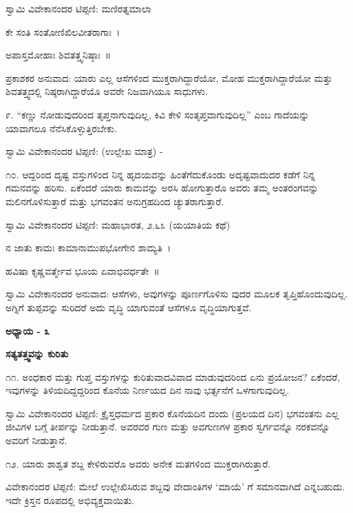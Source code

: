 ಸ್ವಾಮಿ ವಿವೇಕಾನಂದರ ಟಿಪ್ಪಣಿ: ಮಣಿರತ್ನಮಾಲಾ

ಕೇ ಸಂತಿ ಸಂತೋಣಿಖಿಲವೀತರಾಗಾಃ~।

ಅಪಾಸ್ತಮೋಹಾಃ ಶಿವತತ್ತ್ವನಿಷ್ಠಾಃ~॥

ಪ್ರಕಾಶಕರ ಅನುವಾದ: ಯಾರು ಎಲ್ಲ ಆಸೆಗಳಿಂದ ಮುಕ್ತರಾಗಿದ್ದಾರೆಯೋ, ಮೋಹ ಮುಕ್ತರಾಗಿದ್ದಾರೆಯೋ ಮತ್ತು ಶಿವತತ್ತ್ವದಲ್ಲಿ ನಿಷ್ಠರಾಗಿದ್ದಾರೆಯೊ ಅವರೇ ನಿಜವಾಗಿಯೂ ಸಾಧುಗಳು.

೯. “ಕಣ್ಣು ನೋಡುವುದರಿಂದ ತೃಪ್ತನಾಗುವುದಿಲ್ಲ, ಕಿವಿ ಕೇಳಿ ಸಂತೃಪ್ತವಾಗುವುದಿಲ್ಲ” ಎಂಬ ಗಾದೆಯನ್ನು ಯಾವಾಗಲೂ ನೆನೆಸಿಕೊಳ್ಳುತ್ತಿರಬೇಕು. 

ಸ್ವಾಮಿ ವಿವೇಕಾನಂದರ ಟಿಪ್ಪಣಿ: (ಉಲ್ಲೇಖ ಮಾತ್ರ) - 

೧೦. ಆದ್ದರಿಂದ ದೃಷ್ಟ ವಸ್ತುಗಳಿಂದ ನಿನ್ನ ಹೃದಯವನ್ನು ಹಿಂತೆಗೆದುಕೊಂಡು ಅದೃಷ್ಟವಾದುದರ ಕಡೆಗೆ ನಿನ್ನ ಗಮನವನ್ನು ಹರಿಸು. ಏಕೆಂದರೆ ಯಾರು ಕಾಮವನ್ನು ಅರಸಿ ಹೋಗುತ್ತಾರೊ ಅವರು ತಮ್ಮ ಅಂತರಂಗವನ್ನು ಮಲಿನಗೊಳಿಸುತ್ತಾರೆ ಮತ್ತು ಭಗವಂತನ ಅನುಗ್ರಹದಿಂದ ಚ್ಯುತರಾಗುತ್ತಾರೆ. 

ಸ್ವಾಮಿ ವಿವೇಕಾನಂದರ ಟಿಪ್ಪಣಿ: ಮಹಾಭಾರತ, ೨.೬೩ (ಯಯಾತಿಯ ಕಥೆ)

ನ ಜಾತು ಕಾಮಃ ಕಾಮಾನಾಮುಪಭೋಗೇನ ಶಾಮ್ಯತಿ~।

ಹವಿಷಾ ಕೃಷ್ಣವರ್ತ್ಮೇವ ಭೂಯ ಏವಾಭಿವರ್ಧತೇ~॥

ಸ್ವಾಮಿ ವಿವೇಕಾನಂದರ ಅನುವಾದ: ಆಸೆಗಳು, ಅವುಗಳನ್ನು ಪೂರ್ಣಗೊಳಿಸು ವುದರ ಮೂಲಕ ತೃಪ್ತಿಹೊಂದುವುದಿಲ್ಲ. ಅಗ್ನಿಗೆ ತುಪ್ಪವನ್ನು ಸುರಿದರೆ ಅದು ವೃದ್ಧಿ ಯಾಗುವಂತೆ ಆಸೆಗಳೂ ವೃದ್ಧಿಯಾಗುತ್ತವೆ.

\begin{center}
\textbf{ಅಧ್ಯಾಯ - ೩}
\end{center}

\begin{center}
\textbf{ಸತ್ಯತತ್ತ್ವವನ್ನು ಕುರಿತು}
\end{center}

೧೧. ಅಂಧಕಾರ ಮತ್ತು ಗುಪ್ತ ವಸ್ತುಗಳನ್ನು ಕುರಿತುವಾದವಿವಾದ ಮಾಡುವುದರಿಂದ ಏನು ಪ್ರಯೋಜನ? ಏಕೆಂದರೆ, ಇವುಗಳನ್ನು ತಿಳಿಯದಿದ್ದದ್ದರಿಂದ ಕೊನೆಯ ನಿರ್ಣಯದ ದಿನ ನಾವು ಭರ್ತ್ಸನೆಗೆ ಒಳಗಾಗುವುದಿಲ್ಲ. 

ಸ್ವಾಮಿ ವಿವೇಕಾನಂದರ ಟಿಪ್ಪಣಿ: ಕ್ರೈಸ್ತಧರ್ಮದ ಪ್ರಕಾರ ಕೊನೆಯದಿನ ದಂದು (ಪ್ರಲಯದ ದಿನ) ಭಗವಂತನು ಎಲ್ಲ ಜೀವಿಗಳ ಬಗ್ಗೆ ತೀರ್ಪನ್ನು ನೀಡುತ್ತಾನೆ. ಅವರವರ ಗುಣ ಮತ್ತು ಅವಗುಣಗಳ ಪ್ರಕಾರ ಸ್ವರ್ಗವನ್ನೊ ನರಕವನ್ನೊ ಅವರಿಗೆ ನೀಡುತ್ತಾನೆ.

೧೨. ಯಾರು ಶಾಶ್ವತ ಶಬ್ದ ಕೇಳಿರುವರೊ ಅವರು ಅನೇಕ ಮತಗಳಿಂದ ಮುಕ್ತರಾಗಿರುತ್ತಾರೆ. 

ವಿವೇಕಾನಂದರ ಟಿಪ್ಪಣಿ: ಮೇಲೆ ಉಲ್ಲೇಖಿಸಿರುವ ಶಬ್ದವು ವೇದಾಂತಿಗಳ ‘ಮಾಯೆ’ ಗೆ ಸಮಾನವಾಗಿದೆ ಎನ್ನಬಹುದು. ಇದೇ ಕ್ರಿಸ್ತನ ರೂಪದಲ್ಲಿ ಅಭಿವ್ಯಕ್ತವಾಯಿತು.

